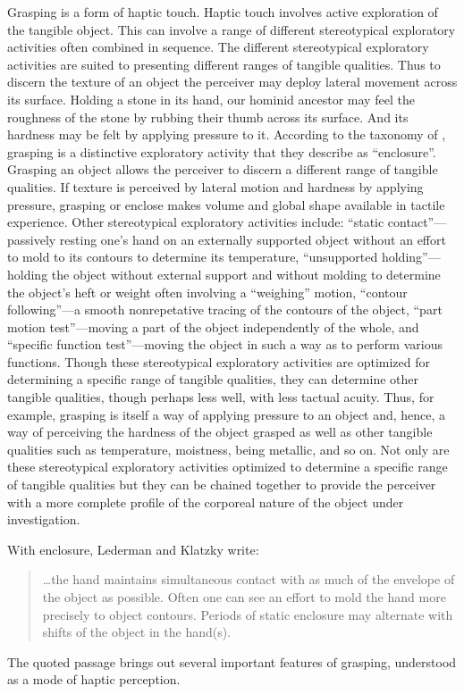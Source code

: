 \documentclass[12pt]{article}
\begin{document}
Grasping is a form of haptic touch. Haptic touch involves active exploration of the tangible object. This can involve a range of different stereotypical exploratory activities often combined in sequence. The different stereotypical exploratory activities are suited to presenting different ranges of tangible qualities. Thus to discern the texture of an object the perceiver may deploy lateral movement across its surface. Holding a stone in its hand, our hominid ancestor may feel the roughness of the stone by rubbing their thumb across its surface. And its hardness may be felt by applying pressure to it. According to the taxonomy of \citet{Lederman:1987fr}, grasping is a distinctive exploratory activity that they describe as ``enclosure''. Grasping an object allows the perceiver to discern a different range of tangible qualities. If texture is perceived by lateral motion and hardness by applying pressure, grasping or enclose makes volume and global shape available in tactile experience. Other stereotypical exploratory activities include: ``static contact''---passively resting one's hand on an externally supported object without an effort to mold to its contours to determine its temperature, ``unsupported holding''---holding the object without external support and without molding to determine the object's heft or weight often involving a ``weighing'' motion, ``contour following''---a smooth nonrepetative tracing of the contours of the object, ``part motion test''---moving a part of the object independently of the whole, and ``specific function test''---moving the object in such a way as to perform various functions. Though these stereotypical exploratory activities are optimized for determining a specific range of tangible qualities, they can determine other tangible qualities, though perhaps less well, with less tactual acuity. Thus, for example, grasping is itself a way of applying pressure to an object and, hence, a way of perceiving the hardness of the object grasped as well as other tangible qualities such as temperature, moistness, being metallic, and so on. Not only are these stereotypical exploratory activities optimized to determine a specific range of tangible qualities but they can be chained together to provide the perceiver with a more complete profile of the corporeal nature of the object under investigation.

With enclosure, Lederman and Klatzky write:
\begin{quote}
	\ldots the hand maintains simultaneous contact with as much of the envelope of the object as possible. Often one can see an effort to mold the hand more precisely to object contours. Periods of static enclosure may alternate with shifts of the object in the hand(s). \citep[346--7]{Lederman:1987fr}
\end{quote}
The quoted passage brings out several important features of grasping, understood as a mode of haptic perception. 
\end{document}
